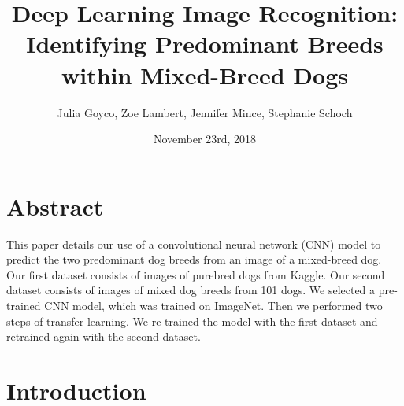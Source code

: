 \documentclass[12pt]{report}
\title{Deep Learning Image Recognition: 
	Identifying Predominant Breeds within Mixed-Breed Dogs}
\date{November 23rd, 2018}
\author{Julia Goyco, Zoe Lambert, Jennifer Mince, Stephanie Schoch}
\begin{document}
	\maketitle
\section*{Abstract} 
\indent	\par  This paper details our use of a convolutional neural network (CNN) model to predict the two predominant dog breeds from an image of a mixed-breed dog. Our first dataset consists of images of purebred dogs from Kaggle. Our second dataset consists of images of mixed dog breeds from 101 dogs.  We selected a pre-trained CNN model, which was trained on ImageNet. Then we performed two steps of transfer learning. We re-trained the model with the first dataset and retrained again with the second dataset.
		\par 
\newpage
 \section* {Introduction} 
		
\end{document}
